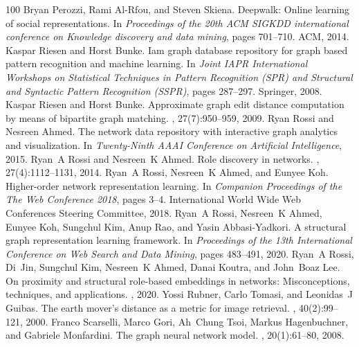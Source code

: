\begin{thebibliography}{100}
Bryan Perozzi, Rami Al-Rfou, and Steven Skiena.
\newblock Deepwalk: Online learning of social representations.
\newblock In {\em Proceedings of the 20th ACM SIGKDD international conference
  on Knowledge discovery and data mining}, pages 701--710. ACM, 2014.
Kaspar Riesen and Horst Bunke.
\newblock Iam graph database repository for graph based pattern recognition and
  machine learning.
\newblock In {\em Joint IAPR International Workshops on Statistical Techniques
  in Pattern Recognition (SPR) and Structural and Syntactic Pattern Recognition
  (SSPR)}, pages 287--297. Springer, 2008.
Kaspar Riesen and Horst Bunke.
\newblock Approximate graph edit distance computation by means of bipartite
  graph matching.
, 27(7):950--959, 2009.
Ryan Rossi and Nesreen Ahmed.
\newblock The network data repository with interactive graph analytics and
  visualization.
\newblock In {\em Twenty-Ninth AAAI Conference on Artificial Intelligence},
  2015.
Ryan~A Rossi and Nesreen~K Ahmed.
\newblock Role discovery in networks.
,
  27(4):1112--1131, 2014.
Ryan~A Rossi, Nesreen~K Ahmed, and Eunyee Koh.
\newblock Higher-order network representation learning.
\newblock In {\em Companion Proceedings of the The Web Conference 2018}, pages
  3--4. International World Wide Web Conferences Steering Committee, 2018.
Ryan~A Rossi, Nesreen~K Ahmed, Eunyee Koh, Sungchul Kim, Anup Rao, and Yasin
  Abbasi-Yadkori.
\newblock A structural graph representation learning framework.
\newblock In {\em Proceedings of the 13th International Conference on Web
  Search and Data Mining}, pages 483--491, 2020.
Ryan~A Rossi, Di~Jin, Sungchul Kim, Nesreen~K Ahmed, Danai Koutra, and
  John~Boaz Lee.
\newblock On proximity and structural role-based embeddings in networks:
  Misconceptions, techniques, and applications.
, 2020.
Yossi Rubner, Carlo Tomasi, and Leonidas~J Guibas.
\newblock The earth mover's distance as a metric for image retrieval.
, 40(2):99--121, 2000.
Franco Scarselli, Marco Gori, Ah~Chung Tsoi, Markus Hagenbuchner, and Gabriele
  Monfardini.
\newblock The graph neural network model.
, 20(1):61--80, 2008.

\end{thebibliography}
